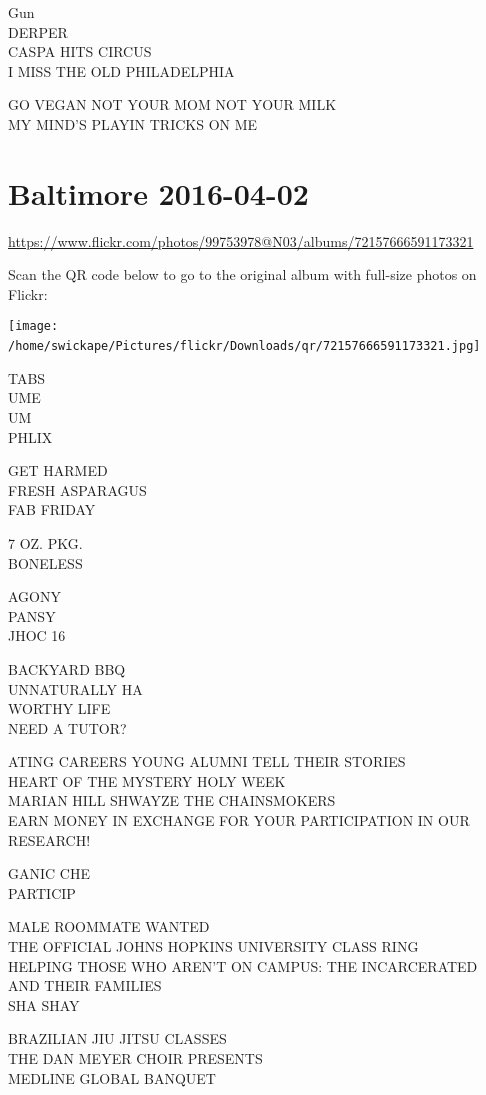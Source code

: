 \documentclass[10pt,letterpaper]{article}
\begin{document}
Gun\\
DERPER\\
CASPA HITS CIRCUS\\
I MISS THE OLD PHILADELPHIA

GO VEGAN NOT YOUR MOM NOT YOUR MILK\\
MY MIND'S PLAYIN TRICKS ON ME
\

\section*{Baltimore 2016-04-02}

\url{https://www.flickr.com/photos/99753978@N03/albums/72157666591173321}

Scan the QR code below to go to the original album with full-size photos on Flickr:

\texttt{[image: /home/swickape/Pictures/flickr/Downloads/qr/72157666591173321.jpg]}
\

TABS\\
UME\\
UM\\
PHLIX

GET HARMED\\
FRESH ASPARAGUS\\
FAB FRIDAY

7 OZ. PKG.\\
BONELESS

AGONY\\
PANSY\\
JHOC 16

BACKYARD BBQ\\
UNNATURALLY HA\\
WORTHY LIFE\\
NEED A TUTOR?

ATING CAREERS YOUNG ALUMNI TELL THEIR STORIES\\
HEART OF THE MYSTERY HOLY WEEK\\
MARIAN HILL SHWAYZE THE CHAINSMOKERS\\
EARN MONEY IN EXCHANGE FOR YOUR PARTICIPATION IN OUR RESEARCH!

GANIC CHE\\
PARTICIP

MALE ROOMMATE WANTED\\
THE OFFICIAL JOHNS HOPKINS UNIVERSITY CLASS RING\\
HELPING THOSE WHO AREN'T ON CAMPUS: THE INCARCERATED AND THEIR FAMILIES\\
SHA SHAY

BRAZILIAN JIU JITSU CLASSES\\
THE DAN MEYER CHOIR PRESENTS\\
MEDLINE GLOBAL BANQUET
\end{document}

